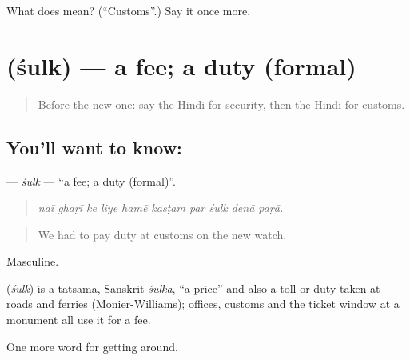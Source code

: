 \begin{tcolorbox}[breakable,colback=teal!4,colframe=teal!35!black,title={Before you move on}]
What does  mean? (\textquotedblleft{}Customs\textquotedblright{}.) Say it once more.
\end{tcolorbox}
\section[\texorpdfstring{\hi{शुल्क} (śulk)}{शुल्क (śulk)}]{ (śulk) — a fee; a duty (formal)}

\label{lesson:HI-C410-sulk}



\begin{quote}
Before the new one: say the Hindi for security, then the Hindi for customs.
\end{quote}

\subsection*{You'll want to know: }
\textbf{} — \emph{śulk} — \textquotedblleft{}a fee; a duty (formal)\textquotedblright{}.

\begin{quote}
         
\end{quote}

\begin{quote}
\emph{naī ghaṛī ke liye hamẽ kasṭam par śulk denā paṛā.}
\end{quote}

\begin{quote}
We had to pay duty at customs on the new watch.
\end{quote}

Masculine.

\begin{cousinweb}
\textbf{} (\emph{śulk}) is a tatsama, Sanskrit \emph{śulka}, \textquotedblleft{}a price\textquotedblright{} and also a toll or duty taken at roads and ferries (Monier-Williams); offices, customs and the ticket window at a monument all use it for a fee.
\end{cousinweb}

\begin{grammarlens}[title={What you've built}]
One more word for getting around.
\end{grammarlens}

